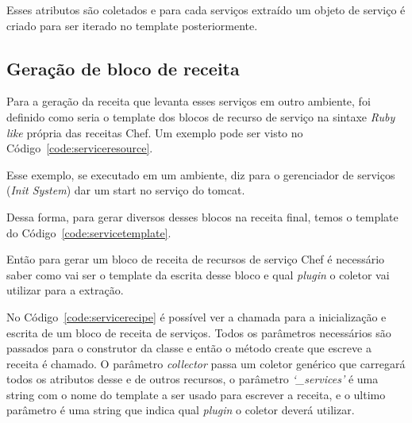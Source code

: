 Esses atributos são coletados e para cada serviços extraído um objeto de serviço
é criado para ser iterado no template posteriormente.

\subsection{Geração de bloco de receita}
Para a geração da receita que levanta esses serviços em outro ambiente, foi 
definido como seria o template dos blocos de recurso de serviço na sintaxe 
\textit{Ruby like} própria das receitas Chef. Um exemplo pode ser visto no Código~\ref{code:serviceresource}.

\noindent\begin{minipage}{\textwidth}
  \lstset{style=shell}
  
\end{minipage}\hfill

Esse exemplo, se executado em um ambiente, diz para o
gerenciador de serviços (\textit{Init System}) dar um start no serviço do tomcat.

Dessa forma, para gerar diversos desses blocos na receita final, temos o template
do Código~\ref{code:servicetemplate}.

\noindent\begin{minipage}{\textwidth}
  \lstset{style=shell}
  
\end{minipage}\hfill

Então para gerar um bloco de receita de recursos de serviço Chef é necessário
saber como vai ser o template da escrita desse bloco e qual \textit{plugin} o
coletor vai utilizar para a extração.

No Código~\ref{code:servicerecipe} é possível ver a chamada para a inicialização e escrita de um
bloco de receita de serviços. Todos os parâmetros necessários são passados para
o construtor da classe e então o método create que escreve a receita é chamado.
O parâmetro \textit{collector} passa um coletor genérico que carregará todos os
atributos desse e de outros recursos, o parâmetro \textit{`\_services'} é uma
string com o nome do template a ser usado para escrever a receita, e o ultimo
parâmetro é uma string que indica qual \textit{plugin} o coletor deverá utilizar.

